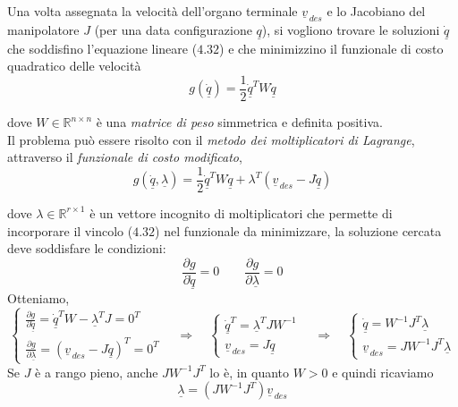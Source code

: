 \paragraph{}
Una volta assegnata la velocità dell'organo terminale $\underline{v}_{\,des}$ e lo Jacobiano del manipolatore $J$ (per una data configurazione $\underline{q}$), si vogliono trovare le soluzioni $\underline{\dot{q}}$ che soddisfino l'equazione lineare ($4.32$) e che minimizzino il funzionale di costo quadratico delle velocità
\begin{equation}
	g(\underline{\dot{q}}) = \frac{1}{2}\underline{\dot{q}}^{T}W\underline{\dot{q}}
\end{equation}

dove $W\in\mathbb{R}^{n \times n}$ è una \emph{matrice di peso} simmetrica e definita positiva.\\
Il problema può essere risolto con il \emph{metodo dei moltiplicatori di Lagrange}, attraverso il \emph{funzionale di costo modificato},
\begin{equation}
	g(\underline{\dot{q}}, \underline{\lambda}) = \frac{1}{2}\underline{\dot{q}}^{T}W\underline{\dot{q}} + \lambda^T(\underline{v}_{\,des} - J\underline{\dot{q}})
\end{equation}

dove $\lambda \in\mathbb{R}^{r \times 1}$ è un vettore incognito di moltiplicatori che permette di incorporare il vincolo ($4.32$) nel funzionale da minimizzare, la soluzione cercata deve soddisfare le condizioni:
\begin{equation}
	\frac{\partial g}{\partial \underline{\dot{q}}} = 0 \qquad \frac{\partial g}{\partial \underline{\lambda}} = 0
\end{equation}
Otteniamo,
\begin{equation*}
	\begin{cases}
		\frac{\partial g}{\partial \underline{\dot{q}}} = \underline{\dot{q}}^TW - \underline{\lambda}^TJ = 0^T \\
		\frac{\partial g}{\partial \underline{\lambda}} = (\underline{v}_{\,des}- J\underline{\dot{q}})^T = 0^T
	\end{cases}
	\quad \Rightarrow \quad 
	\begin{cases}
		\underline{\dot{q}}^T = \underline{\lambda}^T JW^{-1} \\
		\underline{v}_{\,des} = J\underline{\dot{q}} 
	\end{cases}
	\quad \Rightarrow \quad
	\begin{cases}
		\underline{\dot{q}} = W^{-1}J^T \underline{\lambda} \\
		\underline{v}_{\,des} = JW^{-1}J^T \underline{\lambda}
	\end{cases}
\end{equation*}
Se $J$ è a rango pieno, anche $JW^{-1}J^T$ lo è, in quanto $W > 0$ e quindi ricaviamo 
\begin{equation}
	\underline{\lambda} = (JW^{-1}J^T)\underline{v}_{\,des}
\end{equation}

